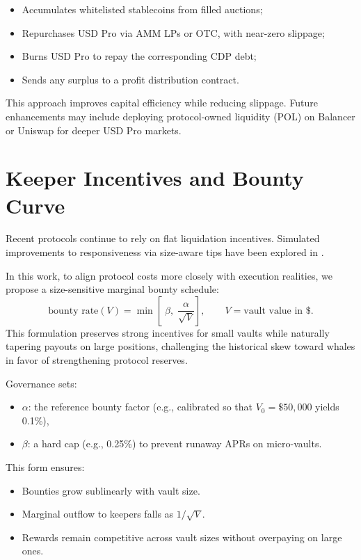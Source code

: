 \documentclass[11pt]{article}
\begin{document}
\begin{itemize}
  \item Accumulates whitelisted stablecoins from filled auctions;
  \item Repurchases USD Pro via AMM LPs or OTC, with near-zero slippage;
  \item Burns USD Pro to repay the corresponding CDP debt;
  \item Sends any surplus to a profit distribution contract.
\end{itemize}

This approach improves capital efficiency while reducing slippage.  
Future enhancements may include deploying protocol-owned liquidity (POL) on Balancer or Uniswap for deeper USD Pro markets.

\section{Keeper Incentives and Bounty Curve}
\label{sec:keeper}
Recent protocols \parencite{aave-liquidation-docs, compound-liquidation-docs, makerdao-auctions-docs} continue to rely on flat liquidation incentives. Simulated improvements to responsiveness via size-aware tips have been explored in \textcite{kirillov2022stablesims}.

In this work, to align protocol costs more closely with execution realities, we propose a size-sensitive marginal bounty schedule:
\[
\text{bounty rate}(V)=\min\!\left[\;\beta,\;\frac{\alpha}{\sqrt{V}}\right],
\qquad V=\text{vault value in \$}.
\]
This formulation preserves strong incentives for small vaults while naturally tapering payouts on large positions, challenging the historical skew toward whales in favor of strengthening protocol reserves.

Governance sets:
\begin{itemize}[noitemsep,topsep=0pt]
  \item \( \alpha \): the reference bounty factor (e.g., calibrated so that \( V_0 = \$50,000 \) yields 0.1\%),
  \item \( \beta \): a hard cap (e.g., 0.25\%) to prevent runaway APRs on micro-vaults.
\end{itemize}

This form ensures:
\begin{itemize}[noitemsep,topsep=0pt]
  \item Bounties grow sublinearly with vault size.
  \item Marginal outflow to keepers falls as \( 1/\sqrt{V} \).
  \item Rewards remain competitive across vault sizes without overpaying on large ones.
\end{itemize}
\end{document}
